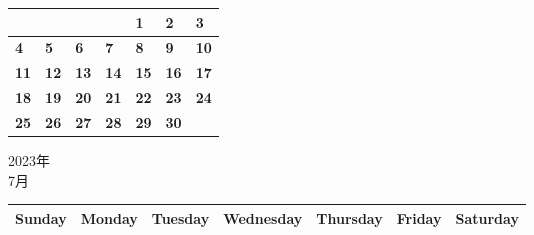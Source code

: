 \documentclass[a4paper,landscape]{jsarticle}
\newcommand{\dig}{\hspace{29mm}}
\newcommand{\tdig}{\hspace{27mm}}
\newcommand{\LBF}{\LARGE\textbf}
\begin{document}
\begingroup
\renewcommand{\arraystretch}{4}
\begin{tabular}{|p{32mm}|p{32mm}|p{32mm}|p{32mm}|p{32mm}|p{32mm}|p{32mm}|}
\hline
&&&&\raisebox{30pt} {\dig\LBF{1}}&\raisebox{30pt} {\dig\LBF{2}}&\raisebox{30pt} {\dig\LBF{3}}\\
\hline
\raisebox{30pt} {\dig\LBF{4}}&\raisebox{30pt} {\dig\LBF{5}}&\raisebox{30pt} {\dig\LBF{6}}&\raisebox{30pt} {\dig\LBF{7}}&\raisebox{30pt} {\dig\LBF{8}}&\raisebox{30pt} {\dig\LBF{9}}&\raisebox{30pt} {\tdig\LBF{10}}\\
\hline
\raisebox{30pt} {\tdig\LBF{11}}&\raisebox{30pt} {\tdig\LBF{12}}&\raisebox{30pt} {\tdig\LBF{13}}&\raisebox{30pt} {\tdig\LBF{14}}&\raisebox{30pt} {\tdig\LBF{15}}&\raisebox{30pt} {\tdig\LBF{16}}&\raisebox{30pt} {\tdig\LBF{17}}\\
\hline
\raisebox{30pt} {\tdig\LBF{18}}&\raisebox{30pt} {\tdig\LBF{19}}&\raisebox{30pt} {\tdig\LBF{20}}&\raisebox{30pt} {\tdig\LBF{21}}&\raisebox{30pt} {\tdig\LBF{22}}&\raisebox{30pt} {\tdig\LBF{23}}&\raisebox{30pt} {\tdig\LBF{24}}\\
\hline
\raisebox{30pt} {\tdig\LBF{25}}&\raisebox{30pt} {\tdig\LBF{26}}&\raisebox{30pt} {\tdig\LBF{27}}&\raisebox{30pt} {\tdig\LBF{28}}&\raisebox{30pt} {\tdig\LBF{29}}&\raisebox{30pt} {\tdig\LBF{30}}&\\
\hline
\end{tabular}
\endgroup
\newpage\begin{center}
	\LARGE 2023年\\
	\LARGE 7月
\end{center}

\begingroup
\renewcommand{\arraystretch}{1.4}
\begin{tabular}{|>{\centering\arraybackslash}p{32mm}|>{\centering\arraybackslash}p{32mm}|>{\centering\arraybackslash}p{32mm}|>{\centering\arraybackslash}p{32mm}|>{\centering\arraybackslash}p{32mm}|>{\centering\arraybackslash}p{32mm}|>{\centering\arraybackslash}p{32mm}|}
\hline
\large Sunday&\large Monday &\large Tuesday&\large Wednesday&\large Thursday&\large Friday&\large Saturday\\
\hline
\end{tabular}
\endgroup
\end{document}
